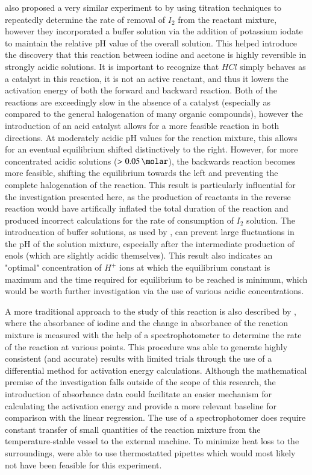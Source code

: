\textcite{reversiblity} also proposed a very similar experiment to \textcite{other_literature_1} by using titration techniques to repeatedly determine the rate of removal of $I_2$ from the reactant mixture, however they incorporated a buffer solution via the addition of potassium iodate to maintain the relative pH value of the overall solution. This helped introduce the discovery that this reaction between iodine and acetone is highly reversible in strongly acidic solutions. It is important to recognize that $HCl$ simply behaves as a catalyst in this reaction, it is not an active reactant, and thus it lowers the activation energy of both the forward and backward reaction. Both of the reactions are exceedingly slow in the absence of a catalyst (especially as compared to the general halogenation of many organic compounds), however the introduction of an acid catalyst allows for a more feasible reaction in both directions. At moderately acidic pH values for the reaction mixture, this allows for an eventual equilibrium shifted distinctively to the right. However, for more concentrated acidic solutions ($>\SI{.05}{\molar}$), the backwards reaction becomes more feasible, shifting the equilibrium towards the left and preventing the complete halogenation of the reaction. This result is particularly influential for the investigation presented here, as the production of reactants in the reverse reaction would have artifically inflated the total duration of the reaction and produced incorrect calculations for the rate of consumption of $I_2$ solution. The introducation of buffer solutions, as used by \textcite{reversiblity}, can prevent large fluctuations in the pH of the solution mixture, especially after the intermediate production of enols (which are slightly acidic themselves). This result also indicates an "optimal" concentration of $H^+$ ions at which the equilibrium constant is maximum and the time required for equilibrium to be reached is minimum, which would be worth further investigation via the use of various acidic concentrations.

A more traditional approach to the study of this reaction is also described by \textcite{main_literature}, where the absorbance of iodine and the change in absorbance of the reaction mixture is measured with the help of a spectrophotometer to determine the rate of the reaction at various points. This procedure was able to generate highly consistent (and accurate) results with limited trials through the use of a differential method for activation energy calculations. Although the mathematical premise of the investigation falls outside of the scope of this research, the introduction of absorbance data could facilitate an easier mechanism for calculating the activation energy and provide a more relevant baseline for comparison with the linear regression. The use of a spectrophotomer does require constant transfer of small quantities of the reaction mixture from the temperature-stable vessel to the external machine. To minimize heat loss to the surroundings, \textcite{main_literature} were able to use thermostatted pipettes which would most likely not have been feasible for this experiment.

